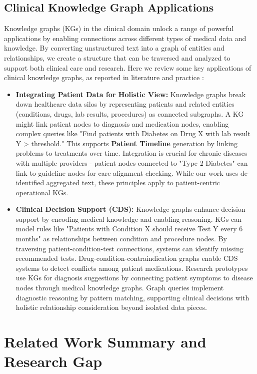 \subsection{Clinical Knowledge Graph Applications}

Knowledge graphs (KGs) in the clinical domain unlock a range of powerful applications by enabling connections across different types of medical data and knowledge. By converting unstructured text into a graph of entities and relationships, we create a structure that can be traversed and analyzed to support both clinical care and research. Here we review some key applications of clinical knowledge graphs, as reported in literature and practice \parencite{Milvus2025}:

\begin{itemize}
\item \textbf{Integrating Patient Data for Holistic View:} Knowledge graphs break down healthcare data silos by representing patients and related entities (conditions, drugs, lab results, procedures) as connected subgraphs. A KG might link patient nodes to diagnosis and medication nodes, enabling complex queries like "Find patients with Diabetes on Drug X with lab result Y > threshold." This supports \textbf{Patient Timeline} generation by linking problems to treatments over time. Integration is crucial for chronic diseases with multiple providers - patient nodes connected to "Type 2 Diabetes" can link to guideline nodes for care alignment checking. While our work uses de-identified aggregated text, these principles apply to patient-centric operational KGs.

\item \textbf{Clinical Decision Support (CDS):} Knowledge graphs enhance decision support by encoding medical knowledge and enabling reasoning. KGs can model rules like "Patients with Condition X should receive Test Y every 6 months" as relationships between condition and procedure nodes. By traversing patient-condition-test connections, systems can identify missing recommended tests. Drug-condition-contraindication graphs enable CDS systems to detect conflicts among patient medications. Research prototypes use KGs for diagnosis suggestions by connecting patient symptoms to disease nodes through medical knowledge graphs. Graph queries implement diagnostic reasoning by pattern matching, supporting clinical decisions with holistic relationship consideration beyond isolated data pieces.
\end{itemize}

\section{Related Work Summary and Research Gap}

